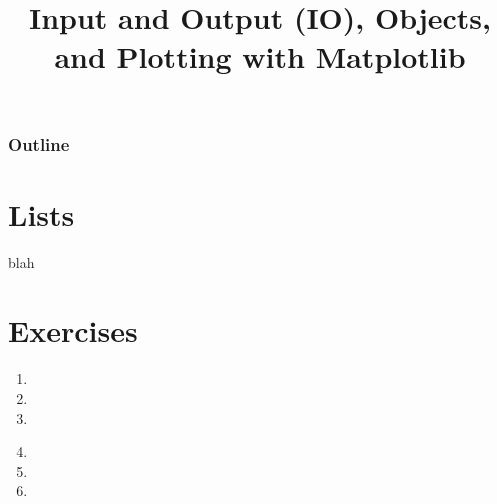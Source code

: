 \documentclass[8pt,a4paper,compress]{beamer}
\title{Input and Output (IO), Objects, and Plotting with Matplotlib}
\date{}
\begin{document}
\begin{frame}
\vfill
\titlepage
\end{frame}

\begin{frame}
\frametitle{Outline}
\tableofcontents
\end{frame}

\section{Lists}
\begin{frame}[fragile]
blah
\end{frame}

\section{Exercises}
\begin{frame}[fragile]
\begin{enumerate}
\item 

\item 

\item 
\end{enumerate}
\end{frame}

\begin{frame}[fragile]
\begin{enumerate}\setcounter{enumi}{3}
\item 

\item 

\item 
\end{enumerate}
\end{frame}
\end{document}
